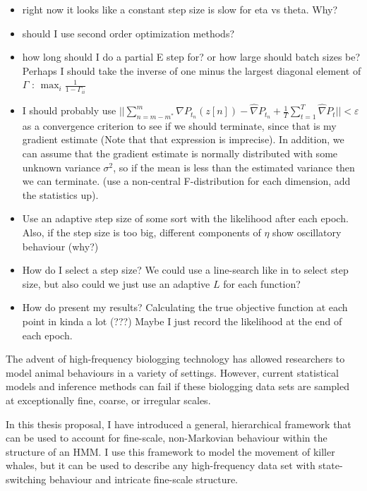 \begin{itemize}
    \item right now it looks like a constant step size is slow for eta vs theta. Why?
    \item should I use second order optimization methods?
    \item how long should I do a partial E step for? or how large should batch sizes be? Perhaps I should take the inverse of one minus the largest diagonal element of $\Gamma$ : $\max_i \frac{1}{1-\Gamma_{ii}}$
    \item I should probably use $||\sum_{n=m-m^*}^{m} \nabla P_{t_n}(z[n]) - \widehat \nabla P_{t_n} + \frac{1}{T} \sum_{t=1}^T \widehat \nabla P_t|| < \varepsilon$ as a convergence criterion to see if we should terminate, since that is my gradient estimate (Note that that expression is imprecise). In addition, we can assume that the gradient estimate is normally distributed with some unknown variance $\sigma^2$, so if the mean is less than the estimated variance then we can terminate. (use a non-central F-distribution for each dimension, add the statistics up).
    \item Use an adaptive step size of some sort with the likelihood after each epoch. Also, if the step size is too big, different components of $\eta$ show oscillatory behaviour (why?)
    \item How do I select a step size? We could use a line-search like in \citep{Schmidt:2017} to select step size, but also could we just use an adaptive $L$ for each function?  
    \item How do present my results? Calculating the true objective function at each point in kinda a lot (???) Maybe I just record the likelihood at the end of each epoch.
\end{itemize}

The advent of high-frequency biologging technology has allowed researchers to model animal behaviours in a variety of settings. However, current statistical models and inference methods can fail if these biologging data sets are sampled at exceptionally fine, coarse, or irregular scales.

In this thesis proposal, I have introduced a general, hierarchical framework that can be used to account for fine-scale, non-Markovian behaviour within the structure of an HMM. I use this framework to model the movement of killer whales, but it can be used to describe any high-frequency data set with state-switching behaviour and intricate fine-scale structure. 

